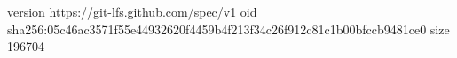 version https://git-lfs.github.com/spec/v1
oid sha256:05c46ac3571f55e44932620f4459b4f213f34c26f912c81c1b00bfccb9481ce0
size 196704
